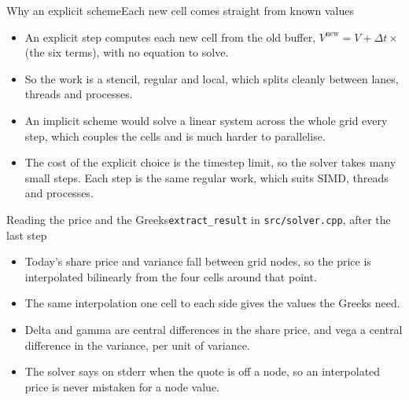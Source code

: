 \documentclass[aspectratio=169,11pt]{beamer}
\begin{document}
\begin{frame}{Why an explicit scheme}{Each new cell comes straight from known values}
  {\small
  \begin{itemize}
    \item An explicit step computes each new cell from the old buffer, $V^{\text{new}} = V + \Delta t \times$ (the six terms), with no equation to solve.
    \item So the work is a stencil, regular and local, which splits cleanly between lanes, threads and processes.
    \item An implicit scheme would solve a linear system across the whole grid every step, which couples the cells and is much harder to parallelise.
    \item The cost of the explicit choice is the timestep limit, so the solver takes many small steps. Each step is the same regular work, which suits SIMD, threads and processes.
  \end{itemize}}
\end{frame}

\begin{frame}{Reading the price and the Greeks}{\texttt{extract\_result} in \texttt{src/solver.cpp}, after the last step}
  {\small
  \begin{itemize}
    \item Today's share price and variance fall between grid nodes, so the price is interpolated bilinearly from the four cells around that point.
    \item The same interpolation one cell to each side gives the values the Greeks need.
    \item Delta and gamma are central differences in the share price, and vega a central difference in the variance, per unit of variance.
    \item The solver says on stderr when the quote is off a node, so an interpolated price is never mistaken for a node value.
  \end{itemize}}
\end{frame}
\end{document}
